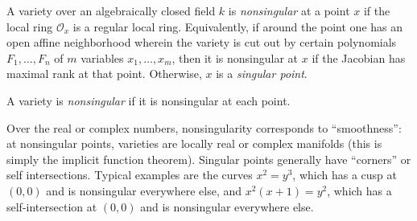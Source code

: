 \documentclass{article}
\begin{document}
A variety over an algebraically closed field $k$
is \emph{nonsingular} at a point $x$
if the local ring $\mathcal{O}_x$ is a regular local ring.
Equivalently, if around the point one has an open affine neighborhood
wherein the variety is cut out
by certain polynomials $F_1, \ldots, F_n$ of $m$ variables $x_1, \ldots, x_m$,
then it is nonsingular at $x$ if the Jacobian has maximal rank at that point.
Otherwise, $x$ is a \emph{singular point}.

A variety is \emph{nonsingular} if it is nonsingular at each point.

Over the real or complex numbers, nonsingularity corresponds to ``smoothness'':
at nonsingular points, varieties are locally real or complex manifolds
(this is simply the implicit function theorem).
Singular points generally have ``corners'' or self intersections.
Typical examples are the curves $x^2=y^3$,
which has a cusp at $(0,0)$ and is nonsingular everywhere else,
and $x^2(x+1)=y^2$,
which has a self-intersection at $(0,0)$ and is nonsingular everywhere else.
\end{document}
